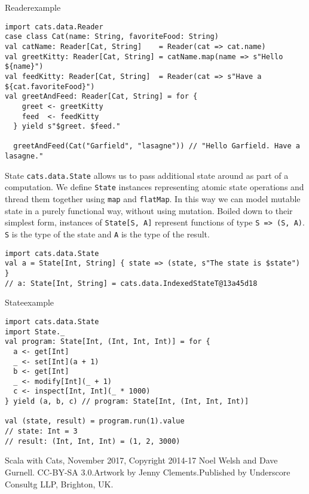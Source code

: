 \documentclass[aspectratio=169]{beamer}
\begin{document}
\begin{frame}[fragile]{Reader}{example}
\begin{verbatim}
import cats.data.Reader
case class Cat(name: String, favoriteFood: String)
val catName: Reader[Cat, String]    = Reader(cat => cat.name)
val greetKitty: Reader[Cat, String] = catName.map(name => s"Hello ${name}")
val feedKitty: Reader[Cat, String]  = Reader(cat => s"Have a ${cat.favoriteFood}")
val greetAndFeed: Reader[Cat, String] = for {
    greet <- greetKitty
    feed  <- feedKitty
  } yield s"$greet. $feed."

  greetAndFeed(Cat("Garfield", "lasagne")) // "Hello Garfield. Have a lasagne."
\end{verbatim}
\end{frame}

\begin{frame}[fragile]{State}
\texttt{cats.data.State} allows us to pass additional state around as part of a computation. We
define \texttt{State}
instances representing atomic state operations and thread them together using \texttt{map} and \texttt{flatMap}. In
this way we can model mutable state in a purely functional way, without using mutation.
\medskip
Boiled down to their simplest form, instances of \texttt{State[S, A]} represent functions of type 
\texttt{S => (S, A)}. \texttt{S} is the type of the state and \texttt{A} is the type of the result.
\begin{verbatim}
import cats.data.State
val a = State[Int, String] { state => (state, s"The state is $state") }
// a: State[Int, String] = cats.data.IndexedStateT@13a45d18
\end{verbatim}
\end{frame}

\begin{frame}[fragile]{State}{example}
\begin{verbatim}
import cats.data.State
import State._
val program: State[Int, (Int, Int, Int)] = for {
  a <- get[Int]
  _ <- set[Int](a + 1)
  b <- get[Int]
  _ <- modify[Int](_ + 1)
  c <- inspect[Int, Int](_ * 1000)
} yield (a, b, c) // program: State[Int, (Int, Int, Int)] 

val (state, result) = program.run(1).value
// state: Int = 3
// result: (Int, Int, Int) = (1, 2, 3000)
\end{verbatim}
\end{frame}

\begin{thebibliography}{9}
Scala with Cats, November 2017, Copyright 2014-17 Noel Welsh and Dave Gurnell. CC-BY-SA 3.0.Artwork by Jenny Clements.Published by Underscore Consultg LLP, Brighton, UK.
\end{thebibliography}
\end{document}
